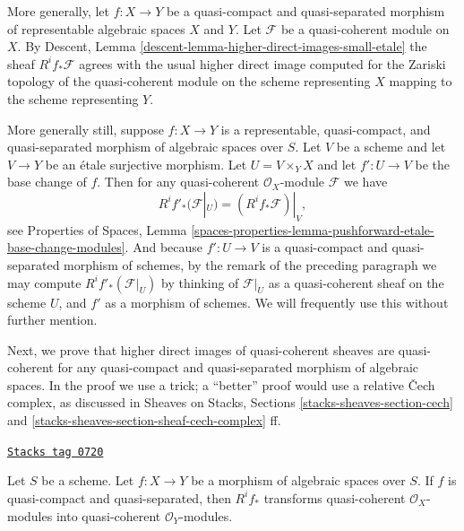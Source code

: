\medskip\noindent
More generally, let $f : X \to Y$ be a quasi-compact and quasi-separated
morphism of representable algebraic spaces $X$ and $Y$. Let
$\mathcal{F}$ be a quasi-coherent module on $X$. By
Descent, Lemma \ref{descent-lemma-higher-direct-images-small-etale}
the sheaf $R^if_*\mathcal{F}$ agrees with the
usual higher direct image computed for the Zariski topology
of the quasi-coherent module on the scheme representing $X$
mapping to the scheme representing $Y$.

\medskip\noindent
More generally still, suppose $f : X \to Y$ is a
representable, quasi-compact, and
quasi-separated morphism of algebraic spaces over $S$. Let $V$ be a scheme
and let $V \to Y$ be an \'etale surjective morphism. Let $U = V \times_Y X$
and let $f' : U \to V$ be the base change of $f$. Then for any
quasi-coherent $\mathcal{O}_X$-module $\mathcal{F}$ we have
\begin{equation}
\label{equation-representable-higher-direct-image}
R^if'_*(\mathcal{F}|_U) = (R^if_*\mathcal{F})|_V,
\end{equation}
see
Properties of Spaces,
Lemma \ref{spaces-properties-lemma-pushforward-etale-base-change-modules}.
And because $f' : U \to V$ is a quasi-compact and quasi-separated
morphism of schemes, by the remark of the preceding paragraph we may
compute $R^if'_*(\mathcal{F}|_U)$ by thinking of $\mathcal{F}|_U$ as a
quasi-coherent sheaf on the scheme $U$, and $f'$ as a morphism of schemes.
We will frequently use this without further mention.

\medskip\noindent
Next, we prove that higher direct images of quasi-coherent sheaves are
quasi-coherent for any quasi-compact and quasi-separated morphism of
algebraic spaces. In the proof we use a trick; a ``better'' proof would
use a relative {\v C}ech complex, as discussed in
Sheaves on Stacks, Sections \ref{stacks-sheaves-section-cech} and
\ref{stacks-sheaves-section-sheaf-cech-complex} ff.

\begin{lemma}
\label{spaces-cohomology-lemma-higher-direct-image}
\href{https://stacks.math.columbia.edu/tag/0720}{\texttt{Stacks tag 0720}}

Let $S$ be a scheme. Let $f : X \to Y$ be a morphism of algebraic spaces
over $S$. If $f$ is quasi-compact and quasi-separated, then $R^if_*$
transforms quasi-coherent $\mathcal{O}_X$-modules into
quasi-coherent $\mathcal{O}_Y$-modules.
\end{lemma}

